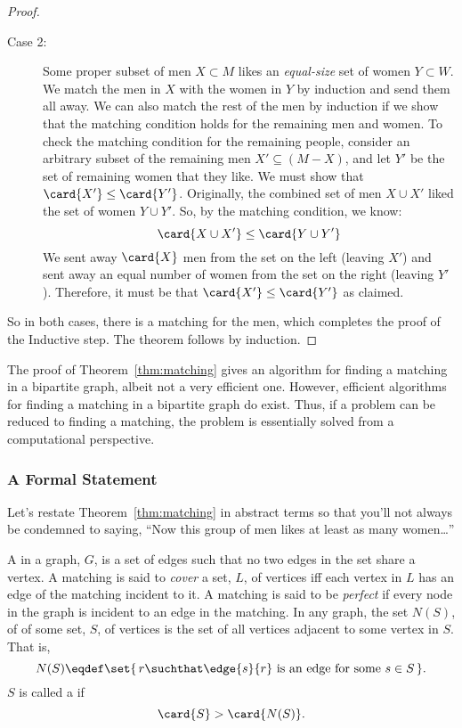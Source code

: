 \begin{proof}
\begin{description}
\item[Case 2:] Some proper subset of men $X \subset M$ likes an
  \emph{equal-size} set of women $Y \subset W$.  We match the men in
  $X$ with the women in $Y$ by induction and send them all away.  We
  can also match the rest of the men by induction if we show that the
  matching condition holds for the remaining men and women.  To check
  the matching condition for the remaining people, consider an
  arbitrary subset of the remaining men $X' \subseteq (M - X)$, and
  let $Y'$ be the set of remaining women that they like.  We must show
  that $\card{X'} \leq \card{Y'}$.  Originally, the combined set of
  men $X \cup X'$ liked the set of women $Y \cup Y'$.  So, by the
  matching condition, we know:
%
  \begin{equation*}
  \card{X \cup X'}  \leq  \card{Y \cup Y'}
  \end{equation*}
%
  We sent away $\card{X}$ men from the set on the left (leaving $X'$)
  and sent away an equal number of women from the set on the right
  (leaving $Y'$).  Therefore, it must be that $\card{X'} \leq
  \card{Y'}$ as claimed.
\end{description}

So in both cases, there is a matching for the men, which completes the
proof of the Inductive step.  The theorem follows by induction.
\end{proof}

The proof of Theorem~\ref{thm:matching} gives an algorithm for finding
a matching in a bipartite graph, albeit not a very efficient one.
However, efficient algorithms for finding a matching in a bipartite
graph do exist.  Thus, if a problem can be reduced to finding a
matching, the problem is essentially solved from a computational
perspective.

\subsubsection{A Formal Statement}

Let's restate Theorem~\ref{thm:matching} in abstract terms so that
you'll not always be condemned to saying, ``Now this group of men
likes at least as many women\dots''

\begin{definition}\label{def:5K}

A  in a graph, $G$, is a set of edges such that no two
edges in the set share a vertex.  A matching is said to \emph{cover} a
set, $L$, of vertices iff each vertex in $L$ has an edge of the
matching incident to it.  A matching is said to be \emph{perfect} if
every node in the graph is incident to an edge in the matching.  In
any graph, the set $N(S)$, of  of some set, $S$, of
vertices is the set of all vertices adjacent to some vertex in $S$.
That is,
\[
N(S) \eqdef \set{\,r \suchthat \edge{s}{r}\text{ is an edge for some }s \in S\,}.
\]
$S$ is called a  if
\[
\card{S} > \card{N(S)}.
\]
\end{definition}

